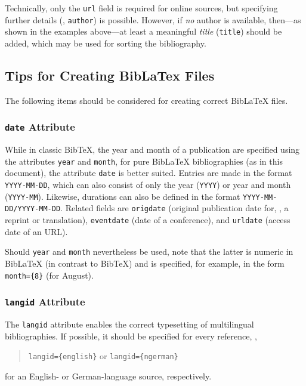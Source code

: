 Technically, only the \texttt{url} field is required for online
sources, but specifying further details (\eg, \texttt{author}) is possible.
However, if \emph{no} author is available, then---as shown in the examples
above---at least a meaningful \emph{title} (\texttt{title}) should be added,
which may be used for sorting the bibliography.

\subsection{Tips for Creating BibLaTex Files}
\label{sec:tips-on-biblatex}

The following items should be considered for creating correct BibLaTeX
files.

\subsubsection{\texttt{date} Attribute}

While in classic BibTeX, the year and month of a publication are specified using
the attributes \texttt{year} and \texttt{month}, for pure BibLaTeX
bibliographies (as in this document), the attribute \texttt{date} is better
suited. Entries are made in the format \texttt{YYYY-MM-DD}, which can also
consist of only the year (\texttt{YYYY}) or year and month (\texttt{YYYY-MM}).
Likewise, durations can also be defined in the format
\texttt{YYYY-MM-DD/YYYY-MM-DD}. Related fields are \texttt{origdate} (original
publication date for, \eg, a reprint or translation), \texttt{eventdate} (date
of a conference), and \texttt{urldate} (access date of an URL).

Should \texttt{year} and \texttt{month} nevertheless be used, note that the
latter is numeric in BibLaTeX (in contrast to BibTeX) and is specified,
for example, in the form \verb!month={8}! (for August).

\subsubsection{\texttt{langid} Attribute}

The \texttt{langid} attribute enables the correct typesetting of multilingual
bibliographies. If possible, it should be specified for every reference, \eg,
%
\begin{quote}
\verb!langid={english}! \quad or \quad \verb!langid={ngerman}!
\end{quote}
%
for an English- or German-language source, respectively.

